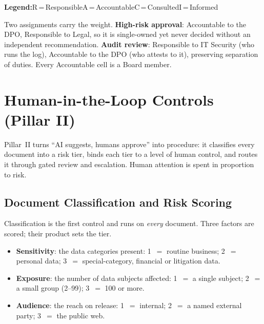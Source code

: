 \documentclass[12pt,a4paper]{article}
\begin{document}
\begin{tcolorbox}[
  enhanced, sharp corners, colback=white, colframe=gray!45, boxrule=0.5pt,
  left=8pt, right=8pt, top=5pt, bottom=5pt,
]
\textbf{Legend:}\quad R\,=\,Responsible\quad A\,=\,Accountable\quad C\,=\,Consulted\quad I\,=\,Informed
\end{tcolorbox}

Two assignments carry the weight. \textbf{High-risk approval}: Accountable to the DPO, Responsible to Legal, so it is single-owned yet never decided without an independent recommendation. \textbf{Audit review}: Responsible to IT Security (who runs the log), Accountable to the DPO (who attests to it), preserving separation of duties. Every Accountable cell is a Board member.

\section{Human-in-the-Loop Controls (Pillar II)}
\label{sec:hitl}

Pillar~II turns ``AI suggests, humans approve'' into procedure: it classifies every document into a risk tier, binds each tier to a level of human control, and routes it through gated review and escalation. Human attention is spent in proportion to risk.

\subsection{Document Classification and Risk Scoring}

Classification is the first control and runs on \emph{every} document. Three factors are scored; their product sets the tier.

\begin{definitionbox}[Risk Score $=$ Sensitivity $\times$ Exposure $\times$ Audience]
\begin{itemize}
  \item \textbf{Sensitivity}: the data categories present: 1~$=$ routine business; 2~$=$ personal data; 3~$=$ special-category, financial or litigation data.
  \item \textbf{Exposure}: the number of data subjects affected: 1~$=$ a single subject; 2~$=$ a small group (2--99); 3~$=$ 100 or more.
  \item \textbf{Audience}: the reach on release: 1~$=$ internal; 2~$=$ a named external party; 3~$=$ the public web.
\end{itemize}
\end{definitionbox}
\end{document}
